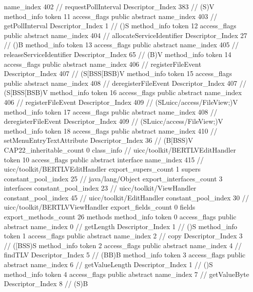 {{{{{					name_index	402		// requestPollInterval
					Descriptor_Index	383		// (S)V
				}
				method_info {
					token	11
					access_flags	public abstract
					name_index	403		// getPollInterval
					Descriptor_Index	1		// ()S
				}
				method_info {
					token	12
					access_flags	public abstract
					name_index	404		// allocateServiceIdentifier
					Descriptor_Index	27		// ()B
				}
				method_info {
					token	13
					access_flags	public abstract
					name_index	405		// releaseServiceIdentifier
					Descriptor_Index	65		// (B)V
				}
				method_info {
					token	14
					access_flags	public abstract
					name_index	406		// registerFileEvent
					Descriptor_Index	407		// (S[BSS[BSB)V
				}
				method_info {
					token	15
					access_flags	public abstract
					name_index	408		// deregisterFileEvent
					Descriptor_Index	407		// (S[BSS[BSB)V
				}
				method_info {
					token	16
					access_flags	public abstract
					name_index	406		// registerFileEvent
					Descriptor_Index	409		// (SLuicc/access/FileView;)V
				}
				method_info {
					token	17
					access_flags	public abstract
					name_index	408		// deregisterFileEvent
					Descriptor_Index	409		// (SLuicc/access/FileView;)V
				}
				method_info {
					token	18
					access_flags	public abstract
					name_index	410		// setMenuEntryTextAttribute
					Descriptor_Index	36		// (B[BSS)V
				}
			}
			CAP22_inheritable_count	0
		}
		class_info {		// uicc/toolkit/BERTLVEditHandler
			token	10
			access_flags	public abstract interface
			name_index	415		// uicc/toolkit/BERTLVEditHandler
			export_supers_count	1
			supers {
				constant_pool_index	25		// java/lang/Object
			}
			export_interfaces_count	3
			interfaces {
				constant_pool_index	23		// uicc/toolkit/ViewHandler
				constant_pool_index	45		// uicc/toolkit/EditHandler
				constant_pool_index	30		// uicc/toolkit/BERTLVViewHandler
			}
			export_fields_count	0
			fields {
			}
			export_methods_count	26
			methods {
				method_info {
					token	0
					access_flags	public abstract
					name_index	0		// getLength
					Descriptor_Index	1		// ()S
				}
				method_info {
					token	1
					access_flags	public abstract
					name_index	2		// copy
					Descriptor_Index	3		// ([BSS)S
				}
				method_info {
					token	2
					access_flags	public abstract
					name_index	4		// findTLV
					Descriptor_Index	5		// (BB)B
				}
				method_info {
					token	3
					access_flags	public abstract
					name_index	6		// getValueLength
					Descriptor_Index	1		// ()S
				}
				method_info {
					token	4
					access_flags	public abstract
					name_index	7		// getValueByte
					Descriptor_Index	8		// (S)B
}}}}}
